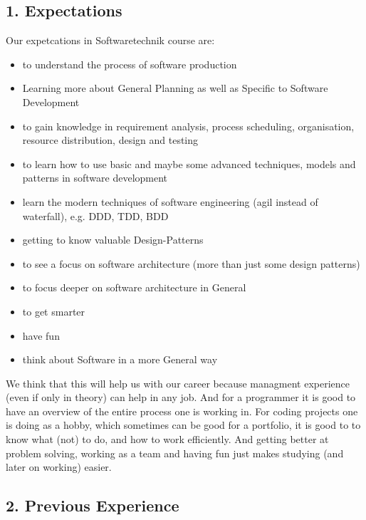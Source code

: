 \documentclass{scrartcl}
\begin{document}
\subsection*{1. Expectations}
Our expetcations in Softwaretechnik course are:
\begin{itemize}
\item to understand the process of software production
\item Learning more about General Planning as well as
Specific to Software Development
\item to gain knowledge in requirement analysis, process scheduling,
organisation, resource distribution, design and testing
\item to learn how to use basic and maybe some advanced techniques,
models and patterns in software development
\item learn the modern techniques of software engineering (agil instead of waterfall), e.g. DDD, TDD, BDD
\item getting to know valuable Design-Patterns
\item to see a focus on software architecture (more than just some design patterns)
\item to focus deeper on software architecture in General
\item to get smarter
\item have fun
\item think about Software in a more General way
\end{itemize}

We think that this will help us with our career because managment experience (even if only in theory) can help in any job. And for a programmer it is good to have an overview of the entire process one is working in. For coding projects one is doing as a hobby, which sometimes can be good for a portfolio, it is good to to know what (not) to do, and how to work efficiently. And getting better at problem solving, working as a team and having fun just makes studying (and later on working) easier.

\subsection*{2. Previous Experience}
\end{document}
